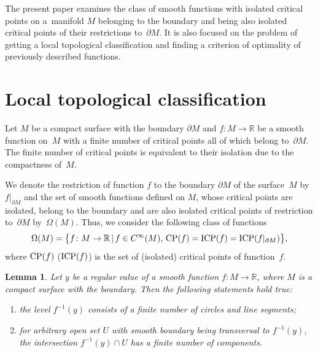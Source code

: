 \documentclass[10pt,a4paper]{amsart}
\numberwithin{equation}{section}
\newtheorem{Lemma}[Theorem]{Lemma}
 { \theoremstyle{definition}
\newtheorem{Definition}[Theorem]{Definition}
}
\begin{document}
The present paper examines the class of smooth functions with isolated critical points on a~manifold $M$ belonging to the boundary and being also isolated critical points of their restrictions to~$\partial M$. It is also focused on the problem of getting a local topological classif\/ication and f\/inding a criterion of optimality of previously described functions.

\section{Local topological classif\/ication}

Let $M$ be a compact surface with the boundary $\partial M$ and $f\colon M \rightarrow \mathbb{R}$ be a smooth function on~$M$ with a f\/inite number of critical points all of which belong to~$\partial M$. The f\/inite number of critical points is equivalent to their isolation due to the compactness of~$M$.

We denote the restriction of function $f$ to the boundary $\partial M$ of the surface~$M$ by~$f|_{\partial M}$ and the set of smooth functions def\/ined on $M$, whose critical points are isolated, belong to the boundary and are also isolated critical points of restriction to~$\partial M$ by~$\Omega(M)$. Thus, we consider the following class of functions
\begin{gather*}
\Omega(M)=\big\{f\colon M\rightarrow\mathbb{R}\,|\,f\in C^{\infty}(M), \, {\rm CP}(f)={\rm ICP}(f)={\rm ICP}(f|_{\partial M})\big\},
\end{gather*}
where ${\rm CP}(f)$ (${\rm ICP}(f)$) is the set of (isolated) critical points of function~$f$.

\begin{Lemma}\label{lemma2.1}
Let $y$ be a regular value of a smooth function $f\colon M\rightarrow\mathbb{R}$, where $M$ is a compact surface with the boundary. Then the following statements hold true:
\begin{enumerate}\itemsep=0pt
\item[$(i)$] the level $f^{-1}(y)$ consists of a finite number of circles and line segments;

\item[$(ii)$] for arbitrary open set $U$ with smooth boundary being transversal to $f^{-1}(y)$, the intersection $f^{-1}(y)\cap U$ has a finite number of components.
\end{enumerate}
\end{Lemma}
\end{document}
